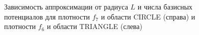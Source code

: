 \documentclass[a4paper]{article}
\begin{document}
\begin{figure}[!h]
\begin{minipage}[h]{0.49\linewidth}
  \end{minipage}
  \caption{Зависимость аппроксимации от радиуса $L$ и числа базисных потенциалов для плотности $f_7$ и области CIRCLE (справа) и  плотности $f_6$ и области TRIANGLE (слева)}
  \label{r1}
\end{figure}
\end{document}

